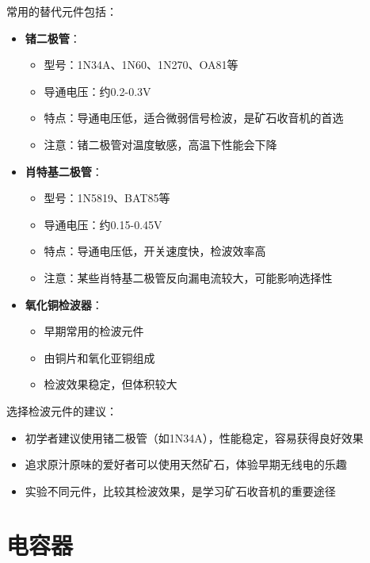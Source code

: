 \documentclass[12pt,UTF8]{ctexbook}
\begin{document}
   常用的替代元件包括：
   \begin{itemize}[leftmargin=3.5em]
       \item \textbf{锗二极管}：
           \begin{itemize}[leftmargin=3.5em]
               \item 型号：1N34A、1N60、1N270、OA81等
               \item 导通电压：约0.2-0.3V
               \item 特点：导通电压低，适合微弱信号检波，是矿石收音机的首选
               \item 注意：锗二极管对温度敏感，高温下性能会下降
           \end{itemize}
       \item \textbf{肖特基二极管}：
           \begin{itemize}[leftmargin=3.5em]
               \item 型号：1N5819、BAT85等
               \item 导通电压：约0.15-0.45V
               \item 特点：导通电压低，开关速度快，检波效率高
               \item 注意：某些肖特基二极管反向漏电流较大，可能影响选择性
           \end{itemize}
       \item \textbf{氧化铜检波器}：
           \begin{itemize}[leftmargin=3.5em]
               \item 早期常用的检波元件
               \item 由铜片和氧化亚铜组成
               \item 检波效果稳定，但体积较大
           \end{itemize}
   \end{itemize}

   选择检波元件的建议：
   \begin{itemize}[leftmargin=3.5em]
       \item 初学者建议使用锗二极管（如1N34A），性能稳定，容易获得良好效果
       \item 追求原汁原味的爱好者可以使用天然矿石，体验早期无线电的乐趣
       \item 实验不同元件，比较其检波效果，是学习矿石收音机的重要途径
   \end{itemize}

\section{电容器}
\end{document}
